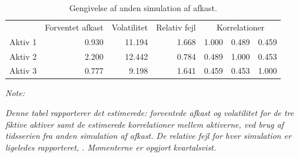 \documentclass[
  a4paper,
  oneside]{memoir}
\begin{document}
\begin{table}[!h]

\caption{\label{tab:sim2}Gengivelse af anden simulation af afkast.}
\centering
\begin{threeparttable}
\begin{tabular}[t]{lrrrrrr}
\toprule
\multicolumn{1}{c}{ } & \multicolumn{1}{c}{Forventet afkast} & \multicolumn{1}{c}{Volatilitet} & \multicolumn{1}{c}{Relativ fejl} & \multicolumn{3}{c}{Korrelationer} \\
\cmidrule(l{3pt}r{3pt}){2-2} \cmidrule(l{3pt}r{3pt}){3-3} \cmidrule(l{3pt}r{3pt}){4-4} \cmidrule(l{3pt}r{3pt}){5-7}
\rowcolor{gray!6}  Aktiv 1 & 0.930 & 11.194 & 1.668 & 1.000 & 0.489 & 0.459\\
Aktiv 2 & 2.200 & 12.442 & 0.784 & 0.489 & 1.000 & 0.453\\
\rowcolor{gray!6}  Aktiv 3 & 0.777 & 9.198 & 1.641 & 0.459 & 0.453 & 1.000\\
\bottomrule
\end{tabular}
\begin{tablenotes}
\item \textit{Note: } 
\item \textit{Denne tabel rapporterer det estimerede: forventede afkast og volatilitet for de tre fiktive aktiver samt de estimerede korrelationer mellem aktiverne, ved brug af tidsserien fra anden simulation af afkast. De relative fejl for hver simulation er ligeledes rapporteret, \citep{Asmussen2007}. Momenterne er opgjort kvartalsvist.}
\end{tablenotes}
\end{threeparttable}
\end{table}
\end{document}
